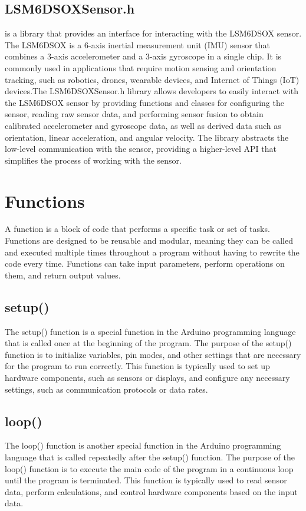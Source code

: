 \subsection{LSM6DSOXSensor.h}

 is a library that provides an interface for interacting with the LSM6DSOX sensor. The LSM6DSOX is a 6-axis inertial measurement unit (IMU) sensor that combines a 3-axis accelerometer and a 3-axis gyroscope in a single chip. It is commonly used in applications that require motion sensing and orientation tracking, such as robotics, drones, wearable devices, and Internet of Things (IoT) devices.The LSM6DSOXSensor.h library allows developers to easily interact with the LSM6DSOX sensor by providing functions and classes for configuring the sensor, reading raw sensor data, and performing sensor fusion to obtain calibrated accelerometer and gyroscope data, as well as derived data such as orientation, linear acceleration, and angular velocity. The library abstracts the low-level communication with the sensor, providing a higher-level API that simplifies the process of working with the sensor.



\section{Functions}
A function is a block of code that performs a specific task or set of tasks. Functions are designed to be reusable and modular, meaning they can be called and executed multiple times throughout a program without having to rewrite the code every time. Functions can take input parameters, perform operations on them, and return output values.


\subsection{setup()}
The setup() function is a special function in the Arduino programming language that is called once at the beginning of the program. The purpose of the setup() function is to initialize variables, pin modes, and other settings that are necessary for the program to run correctly. This function is typically used to set up hardware components, such as sensors or displays, and configure any necessary settings, such as communication protocols or data rates.\cite{ArduinoSetup:2019}

\subsection{loop()}
The loop() function is another special function in the Arduino programming language that is called repeatedly after the setup() function. The purpose of the loop() function is to execute the main code of the program in a continuous loop until the program is terminated. This function is typically used to read sensor data, perform calculations, and control hardware components based on the input data.\cite{ArduinoLoop:2019}

